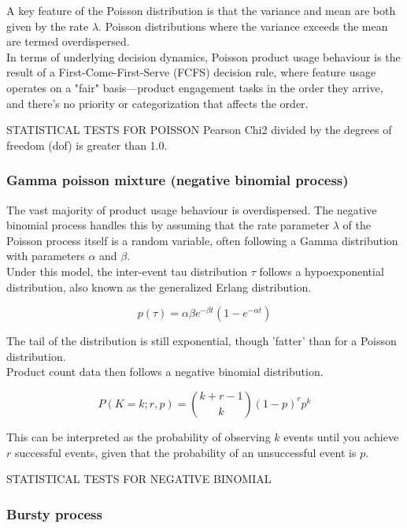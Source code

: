 \documentclass{article}
\begin{document}
A key feature of the Poisson distribution is that the variance and mean are both given by the rate $\lambda$. Poisson distributions where the variance exceeds the mean are termed overdispersed. \\

In terms of underlying decision dynamics, Poisson product usage behaviour is the result of a First-Come-First-Serve (FCFS) decision rule, where feature usage operates on a "fair" basis—product engagement tasks in the order they arrive, and there's no priority or categorization that affects the order. 

STATISTICAL TESTS FOR POISSON
Pearson Chi2  divided by the degrees of freedom (dof) is greater than 1.0.

\subsubsection{Gamma poisson mixture (negative binomial process)}

The vast majority of product usage behaviour is overdispersed. The negative binomial process handles this by assuming that the rate parameter $\lambda$ of the Poisson process itself is a random variable, often following a Gamma distribution with parameters $\alpha$ and $\beta.$ \\

Under this model, the inter-event tau distribution $\tau$ follows a hypoexponential distribution, also known as the generalized Erlang distribution.

\[
p(\tau) = \alpha \beta e^{-\beta t} (1 - e^{-\alpha t})
\]

The tail of the distribution is still exponential, though 'fatter' than for a Poisson distribution. \\


Product count data then follows a negative binomial distribution.

\[
P(K = k; r, p) = \binom{k + r - 1}{k} (1-p)^{r} p^k
\]

This can be interpreted as the probability of observing $k$ events until you achieve $r$ successful events, given that the probability of an unsuccessful event is $p$.

STATISTICAL TESTS FOR NEGATIVE BINOMIAL


\subsubsection{Bursty process}
\end{document}
